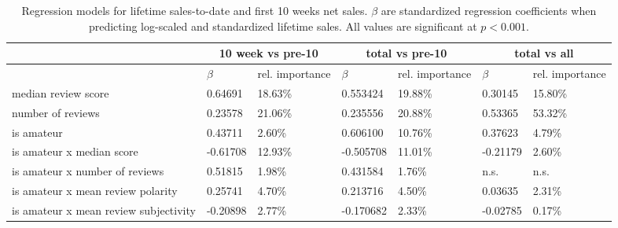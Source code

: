\documentclass[letterpaper]{article}
\begin{document}
\begin{table}[tb]
\centering
\small
\sffamily
\begin{tabular}{lllllll}
& \multicolumn{2}{c}{\textbf{10 week vs pre-10}} & \multicolumn{2}{c}{\textbf{total vs pre-10}} & \multicolumn{2}{c}{\textbf{total vs all}}\\ 
\midrule & \textbf{$\beta$} & rel. importance & \textbf{$\beta$} & rel.
importance & \textbf{$\beta$} & rel. importance\\ 
median review score & 0.64691 & 18.63\% & 0.553424 & 19.88\% & 0.30145 & 15.80\%\\ 
number of reviews & 0.23578 & 21.06\% & 0.235556 & 20.88\% & 0.53365 & 53.32\%\\ 
is amateur & 0.43711 & 2.60\% & 0.606100 & 10.76\% & 0.37623 & 4.79\%\\ 
is amateur x median score  & -0.61708 & 12.93\% & -0.505708 & 11.01\% & -0.21179 & 2.60\%\\  
is amateur x number of reviews & 0.51815 & 1.98\% & 0.431584 & 1.76\% & n.s. & n.s. \\ 
is amateur x mean review polarity & 0.25741 & 4.70\% & 0.213716 & 4.50\% & 0.03635 & 2.31\%\\ 
is amateur x mean review subjectivity & -0.20898 & 2.77\% & -0.170682 & 2.33\% & -0.02785 & 0.17\%\\ 

\end{tabular}
\caption{Regression models for lifetime sales-to-date and first 10 weeks net sales. $\beta$ are standardized regression coefficients when predicting log-scaled and standardized lifetime sales. All values are significant at $p < 0.001$.}
\label{tab:sales_allmodel_lm}
\end{table}

\end{document}
